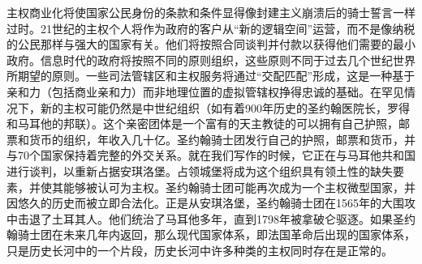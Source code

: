 \begin{paracol}{2}[]
	\switchcolumn
	主权商业化将使国家公民身份的条款和条件显得像封建主义崩溃后的骑士誓言一样过时。21世纪的主权个人将作为政府的客户从“新的逻辑空间”运营，而不是像纳税的公民那样与强大的国家有关。他们将按照合同谈判并付款以获得他们需要的最小政府。信息时代的政府将按照不同的原则组织，这些原则不同于过去几个世纪世界所期望的原则。一些司法管辖区和主权服务将通过“交配匹配”形成，这是一种基于亲和力（包括商业亲和力）而非地理位置的虚拟管辖权挣得忠诚的基础。在罕见情况下，新的主权可能仍然是中世纪组织（如有着900年历史的圣约翰医院长，罗得和马耳他的邦联）。这个亲密团体是一个富有的天主教徒的可以拥有自己护照，邮票和货币的组织，年收入几十亿。圣约翰骑士团发行自己的护照，邮票和货币，并与70个国家保持着完整的外交关系。就在我们写作的时候，它正在与马耳他共和国进行谈判，以重新占据安琪洛堡。占领城堡将成为这个组织具有领土性的缺失要素，并使其能够被认可为主权。圣约翰骑士团可能再次成为一个主权微型国家，并因悠久的历史而被立即合法化。正是从安琪洛堡，圣约翰骑士团在1565年的大围攻中击退了土耳其人。他们统治了马耳他多年，直到1798年被拿破仑驱逐。如果圣约翰骑士团在未来几年内返回，那么现代国家体系，即法国革命后出现的国家体系，只是历史长河中的一个片段，历史长河中许多种类的主权同时存在是正常的。
	

\end{paracol}

